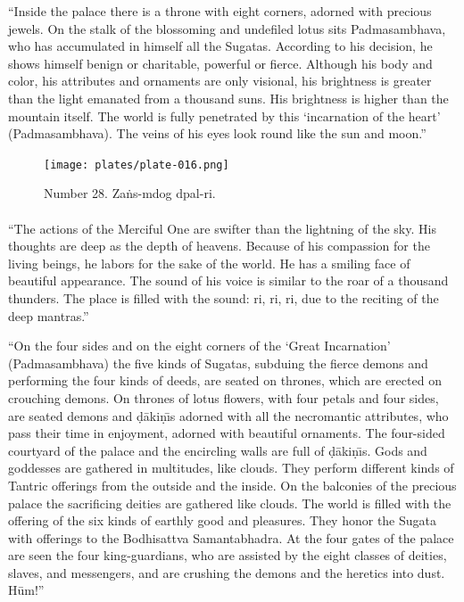 \documentclass[a4paper, 12pt, oneside]{article}
\begin{document}
``Inside the palace there is a throne with eight corners, adorned with  precious jewels. On the stalk of the blossoming and undefiled lotus sits Padmasambhava, who has accumulated in himself all the Sugatas. According to his decision, he shows himself benign or charitable, powerful or fierce. Although his body and color, his attributes and ornaments are only visional, his brightness is greater than the light emanated from a thousand suns. His brightness is higher than the mountain itself. The world is fully penetrated by this `incarnation of the heart' (Padmasambhava). The veins of his eyes look round like the sun and moon.''

\clearpage
\vspace*{\fill}
\begin{figure}[H]
\centering
\texttt{[image: plates/plate-016.png]}
\caption*{Number 28. Za\.{n}s-mdog dpal-ri.}
\end{figure}
\vspace*{\fill}
\clearpage
\paragraph{}
``The actions of the Merciful One are swifter than the lightning of the sky. His thoughts are deep as the depth of heavens. Because of his compassion for the living beings, he labors for the sake of the world. He has a smiling face of beautiful appearance. The sound of his voice is similar to the roar of a thousand thunders. The place is filled with the sound: ri, ri, ri, due to the reciting of the deep mantras.''

``On the four sides and on the eight corners of the `Great Incarnation' (Padmasambhava) the five kinds of Sugatas, subduing the fierce demons and performing the four kinds of deeds, are seated on thrones, which are erected on crouching demons. On thrones of lotus flowers, with four petals and four sides, are seated demons and \d{d}\={a}ki\d{n}\={\i}s adorned with all the necromantic attributes, who pass their time in enjoyment, adorned with beautiful ornaments. The four-sided courtyard of the palace and the encircling walls are full of \d{d}\={a}ki\d{n}\={\i}s. Gods and goddesses are gathered in multitudes, like clouds. They perform different kinds of Tantric offerings from the outside and the inside. On the balconies of the precious palace the sacrificing deities are gathered like clouds. The world is filled with the offering of the six kinds of earthly good and pleasures. They honor the Sugata with offerings to the Bodhisattva Samantabhadra. At the four gates of the palace are seen the four king-guardians, who are assisted by the eight classes of deities, slaves, and messengers, and are crushing the demons and the heretics into dust. H\={u}m!''
\end{document}

